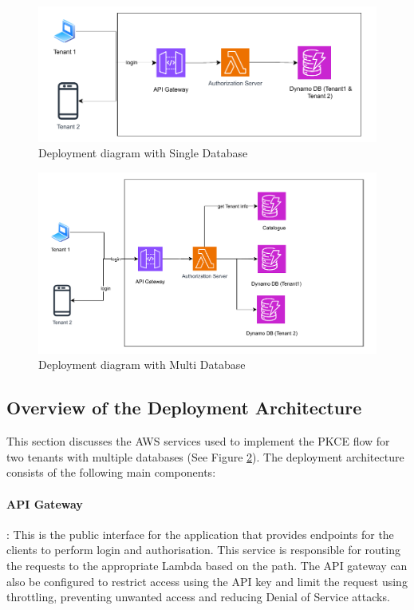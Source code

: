 \begin{figure}[h!]
\label{fig:deployment_diagram_single}
\centering
\includegraphics[width=\textwidth]{pics/deployment_diagram_single.pdf}
\caption{Deployment diagram with Single Database}
\end{figure}

\begin{figure}[h!]
\centering
\label{fig:deployment_diagram_dual}
\includegraphics[width=\textwidth]{pics/deployment_diagram_multi.pdf}
\caption{Deployment diagram with Multi Database}
\end{figure}


\subsection{Overview of the Deployment Architecture}
This section discusses the AWS services used to implement the PKCE flow for two tenants with multiple databases (See Figure \ref{fig:deployment_diagram_dual}). The deployment architecture consists of the following main components:

    \paragraph{API Gateway}: This is the public interface for the application that provides endpoints for the clients to perform login and authorisation. This service is responsible for routing the requests to the appropriate Lambda based on the path. The API gateway can also be configured to restrict access using the API key and limit the request using throttling, preventing unwanted access and reducing Denial of Service attacks.
    
